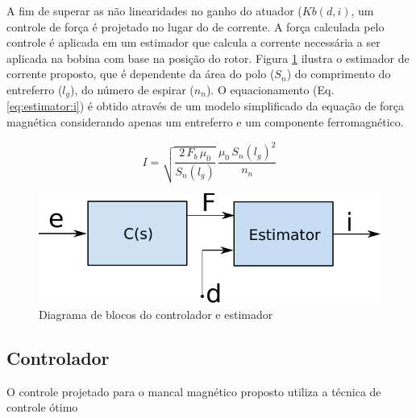 A fim de superar as não linearidades no ganho do atuador ($Kb(d,i)$, um controle de força é projetado no lugar do de corrente. A força calculada pelo controle é aplicada em um estimador que calcula a corrente necessária a ser aplicada na bobina com base na posição do rotor. Figura \ref{fig:diagrama_controlador_estimador} ilustra o estimador de corrente proposto, que é dependente da área do polo ($S_n$) do comprimento do entreferro ($l_g$), do número de espirar ($n_n$). O equacionamento (Eq. \eqref{eq:estimator:i}) é obtido através de um modelo simplificado da equação de força magnética considerando apenas um entreferro e um componente ferromagnético.

	
\begin{equation}
I = \sqrt{\frac{2 \, F_b \, \mu_0}{S_n(l_g)}} \, \frac{\mu_0 \, S_n(l_g)^2}{n_n}
\label{eq:estimator:i}
\end{equation}
	
\begin{figure}[ht!]
	\centering
	\includegraphics[width=0.5\linewidth]{Figs/Modelagem/controlador_estimador}
	\caption{Diagrama de blocos do controlador e estimador}
	\label{fig:diagrama_controlador_estimador}
\end{figure}

\subsection{Controlador}

O controle projetado para o mancal magnético proposto utiliza a técnica de controle ótimo 

